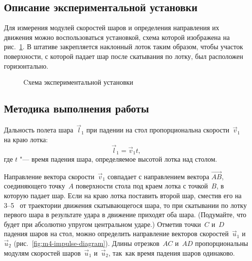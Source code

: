 \documentclass[a4paper, 12pt]{extarticle}
\begin{document}
\subsection{Описание экспериментальной установки}
Для измерения модулей скоростей шаров и определения направления их движения можно воспользоваться установкой, схема которой изображена на рис.~\ref{fig:m4-equipment}. В штативе закрепляется наклонный лоток таким образом, чтобы участок поверхности, с которой падает шар после скатывания по лотку, был расположен горизонтально. %

\begin{figure}[h]
\begin{center}
\end{center}
\caption{Cхема экспериментальной установки \label{fig:m4-equipment}}
\end{figure} %

\subsection{Методика выполнения работы}


Дальность полета шара~$\vec l_1$ при падении на стол пропорциональна скорости~$\vec v_1$ на краю лотка:
\[
\vec l_1 = \vec v_1 t,
\]
где $t$ "--- время падения шара, определяемое высотой лотка над столом.

Направление вектора скорости~$\vec v_1$ совпадает с направлением вектора $\vec{AB}$, соединяющего точку~$A$ поверхности стола под краем лотка с точкой~$B$, в которую падает шар. Если на краю лотка поставить второй шар, сместив его на 3--5~ от траектории движения скатывающегося шара, то при скатывании по лотку первого шара в результате удара в движение приходят оба шара. (Подумайте, что будет при абсолютно упругом центральном ударе.) Отметив точки~$C$ и~$D$ падения шаров на стол, можно определить направление векторов скоростей~$\vec u_1$ и~$\vec u_2$ (рис.~\ref{fig:m4-impulse-diagram}). Длины отрезков~$AC$ и~$AD$ пропорциональны модулям скоростей шаров~$\vec u_1$ и~$\vec u_2$, так~как время падения шаров одинаково. %
\end{document}
